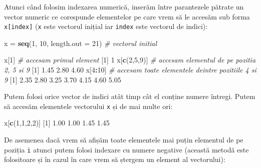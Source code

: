 \documentclass[]{article}
\newenvironment{Shaded}{\begin{snugshade}}{\end{snugshade}}
\newcommand{\KeywordTok}[1]{\textcolor[rgb]{0.13,0.29,0.53}{\textbf{#1}}}
\newcommand{\DataTypeTok}[1]{\textcolor[rgb]{0.13,0.29,0.53}{#1}}
\newcommand{\DecValTok}[1]{\textcolor[rgb]{0.00,0.00,0.81}{#1}}
\newcommand{\FloatTok}[1]{\textcolor[rgb]{0.00,0.00,0.81}{#1}}
\newcommand{\StringTok}[1]{\textcolor[rgb]{0.31,0.60,0.02}{#1}}
\newcommand{\CommentTok}[1]{\textcolor[rgb]{0.56,0.35,0.01}{\textit{#1}}}
\newcommand{\OperatorTok}[1]{\textcolor[rgb]{0.81,0.36,0.00}{\textbf{#1}}}
\newcommand{\NormalTok}[1]{#1}
\begin{document}
Atunci când folosim indexarea numerică, inserăm între parantezele
pătrate un vector numeric ce corespunde elementelor pe care vrem să le
accesăm sub forma \texttt{x{[}index{]}} (\texttt{x} este vectorul
inițial iar \texttt{index} este vectorul de indici):

\begin{Shaded}
\begin{Highlighting}[]
\NormalTok{x =}\StringTok{ }\KeywordTok{seq}\NormalTok{(}\DecValTok{1}\NormalTok{, }\DecValTok{10}\NormalTok{, }\DataTypeTok{length.out =} \DecValTok{21}\NormalTok{) }\CommentTok{# vectorul initial }

\NormalTok{x[}\DecValTok{1}\NormalTok{] }\CommentTok{# accesam primul element}
\NormalTok{[}\DecValTok{1}\NormalTok{] }\DecValTok{1}
\NormalTok{x[}\KeywordTok{c}\NormalTok{(}\DecValTok{2}\NormalTok{,}\DecValTok{5}\NormalTok{,}\DecValTok{9}\NormalTok{)] }\CommentTok{# accesam elementul de pe pozitia 2, 5 si 9}
\NormalTok{[}\DecValTok{1}\NormalTok{] }\FloatTok{1.45} \FloatTok{2.80} \FloatTok{4.60}
\NormalTok{x[}\DecValTok{4}\OperatorTok{:}\DecValTok{10}\NormalTok{] }\CommentTok{# accesam toate elementele deintre pozitiile 4 si 9}
\NormalTok{[}\DecValTok{1}\NormalTok{] }\FloatTok{2.35} \FloatTok{2.80} \FloatTok{3.25} \FloatTok{3.70} \FloatTok{4.15} \FloatTok{4.60} \FloatTok{5.05}
\end{Highlighting}
\end{Shaded}

Putem folosi orice vector de indici atât timp cât el conține numere
întregi. Putem să accesăm elementele vectorului \texttt{x} și de mai
multe ori:

\begin{Shaded}
\begin{Highlighting}[]
\NormalTok{x[}\KeywordTok{c}\NormalTok{(}\DecValTok{1}\NormalTok{,}\DecValTok{1}\NormalTok{,}\DecValTok{2}\NormalTok{,}\DecValTok{2}\NormalTok{)]}
\NormalTok{[}\DecValTok{1}\NormalTok{] }\FloatTok{1.00} \FloatTok{1.00} \FloatTok{1.45} \FloatTok{1.45}
\end{Highlighting}
\end{Shaded}

De asemenea dacă vrem să afișăm toate elementele mai puțin elementul de
pe poziția \texttt{i} atunci putem folosi indexare cu numere negative
(această metodă este folositoare și în cazul în care vrem să ștergem un
element al vectorului):
\end{document}
